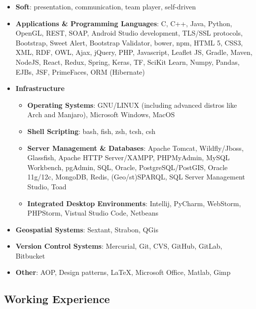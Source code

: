 \documentclass[a4paper,oneside,10pt]{article}
\begin{document}
	\begin{itemize}

		\item \textbf{Soft}: presentation, communication, team player, self-driven

		\item \textbf{Applications \& Programming Languages}: C, C++, Java, Python, OpenGL, REST, SOAP, Android Studio development, TLS/SSL protocols, Bootstrap, Sweet Alert, Bootstrap Validator, bower, npm, HTML 5, CSS3, XML, RDF, OWL, Ajax, jQuery, PHP, Javascript, Leaflet JS, Gradle, Maven, NodeJS, React, Redux, Spring, Keras, TF, SciKit Learn, Numpy, Pandas, EJBs, JSF, PrimeFaces, ORM (Hibernate)

		\item \textbf{Infrastructure} 

			\begin{itemize}
				\item \textbf{Operating Systems}: GNU/LINUX (including advanced distros like Arch and Manjaro), Microsoft Windows, MacOS 

				\item \textbf{Shell Scripting}: bash, fish, zsh, tcsh, csh

				\item \textbf{Server Management \& Databases}: Apache Tomcat, Wildfly/Jboss, Glassfish, Apache HTTP Server/XAMPP, PHPMyAdmin, MySQL Workbench, pgAdmin, SQL, Oracle, PostgreSQL/PostGIS, Oracle 11g/12c, MongoDB, Redis, (Geo/st)SPARQL, SQL Server Management Studio, Toad

				\item \textbf{Integrated Desktop Environments}: Intellij, PyCharm, WebStorm, PHPStorm, Vistual Studio Code, Netbeans

			\end{itemize}

		\item \textbf{Geospatial Systems}: Sextant, Strabon, QGis

		\item \textbf{Version Control Systems}: Mercurial, Git, CVS, GitHub, GitLab, Bitbucket

		\item \textbf{Other}: AOP, Design patterns, \LaTeX, Microsoft Office, Matlab, Gimp

	\end{itemize}

\subsection*{Working Experience}
\end{document}
